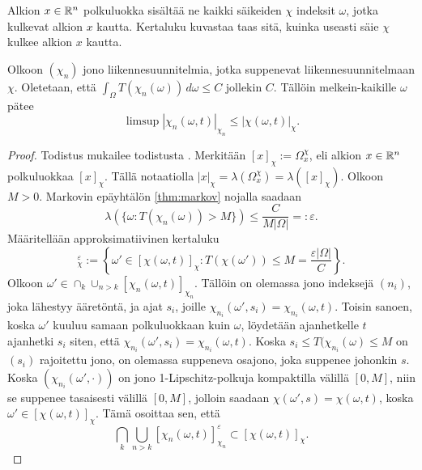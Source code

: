 \documentclass[12pt,oneside,a4paper]{amsbook} %
\begin{document}
Alkion $x\in \mathbb{R}^n$ polkuluokka sisältää ne kaikki säikeiden $\chi$ indeksit $\omega$, jotka kulkevat alkion $x$ kautta. Kertaluku kuvastaa taas sitä, kuinka useasti säie $\chi$ kulkee alkion $x$ kautta.

\begin{theorem} \label{thm:multiplicityXnLeX}
    Olkoon $(\chi_n)$ jono liikennesuunnitelmia, jotka suppenevat liikennesuunnitelmaan $\chi$. Oletetaan, että $\int_\Omega T(\chi_n(\omega))\, d\omega \le C$ jollekin $C$. Tällöin melkein-kaikille $\omega$ pätee
    \begin{equation*}
        \limsup |\chi_n(\omega, t)|_{\chi_n} \le |\chi(\omega, t)|_\chi.
    \end{equation*}
\end{theorem}
\begin{proof}
    Todistus mukailee todistusta \cite[s. 31-32]{optimal}. Merkitään $[x]_\chi := \Omega_x^\chi$, eli alkion $x\in \mathbb{R}^n$ polkuluokkaa $[x]_\chi$. Tällä notaatiolla $|x|_\chi = \lambda(\Omega_x^\chi) = \lambda([x]_\chi)$. Olkoon $M > 0.$ Markovin epäyhtälön \ref{thm:markov} nojalla saadaan
    \begin{equation*}
        \lambda(\{\omega : T(\chi_n(\omega)) > M\}) \le \frac{C}{M|\Omega|} =: \varepsilon.
    \end{equation*}
    Määritellään approksimatiivinen kertaluku
    \begin{equation*}
        [\chi(\omega,t)]_\chi^\varepsilon := \left\{\omega' \in [\chi(\omega, t)]_\chi : T(\chi(\omega')) \le M = \frac{\varepsilon|\Omega|}{C}\right\}.
    \end{equation*}
    Olkoon $\omega' \in \cap_k \cup_{n > k} [\chi_n(\omega, t)]_{\chi_n}$. Tällöin on olemassa jono  indeksejä $(n_i)$, joka lähestyy ääretöntä, ja ajat $s_i$, joille $\chi_{n_i}(\omega',s_i) = \chi_{n_i}(\omega, t)$. Toisin sanoen, koska $\omega'$ kuuluu samaan polkuluokkaan kuin $\omega$, löydetään ajanhetkelle $t$ ajanhetki $s_i$ siten, että $\chi_{n_i}(\omega',s_i) = \chi_{n_i}(\omega, t)$. Koska $s_i\le T(\chi_{n_i}(\omega) \le M$ on $(s_i)$ rajoitettu jono, on olemassa suppeneva osajono, joka suppenee johonkin $s$. Koska $(\chi_{n_i}(\omega', \cdot))$ on jono 1-Lipschitz-polkuja kompaktilla välillä $[0, M]$, niin se suppenee tasaisesti välillä $[0, M]$, jolloin saadaan $\chi(\omega', s) = \chi(\omega, t)$, koska $\omega' \in [\chi(\omega, t)]_\chi$. Tämä osoittaa sen, että 
    \begin{equation}\label{eq:multiplicityOfXn1}
        \bigcap_k \bigcup_{n > k} [\chi_n(\omega, t)]_{\chi_n}^\varepsilon \subset [\chi(\omega, t)]_\chi.
    \end{equation}
    

\end{proof}
\end{document}
